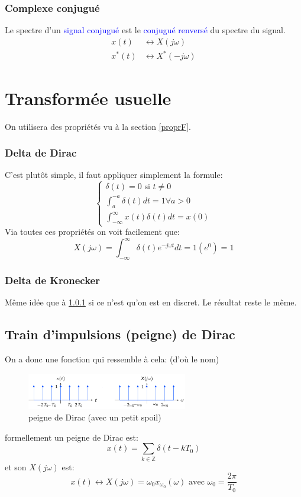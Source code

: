 \documentclass{report}
\begin{document}
\subsubsection{Complexe conjugué}
Le spectre d'un \textcolor{blue}{signal conjugué} est le \textcolor{blue}{conjugué renversé} du spectre du signal.
\begin{align*}
x(t) &\longleftrightarrow X(j\omega)\\
x^*(t) &\longleftrightarrow X^*(-j\omega)
\end{align*}


\section{Transformée usuelle}
On utilisera des propriétés vu à la section \ref{proprF}.

\subsubsection{Delta de Dirac} \label{Dirac}
C'est plutôt simple, il faut appliquer simplement la formule:
\begin{equation}
\begin{cases}
\delta(t) = 0 \text{ si } t \neq 0\\
\int_a^{-a} \delta(t) dt = 1 \forall a > 0\\
\int_{-\infty}^{\infty} x(t) \delta(t) dt = x(0)
\end{cases}
\end{equation}
Via toutes ces propriétés on voit facilement que:
\begin{equation}
X(j\omega) = \int_{-\infty}^{\infty} \delta(t) e^{-j \omega t} dt = 1(e^0) = 1
\end{equation}

\subsubsection{Delta de Kronecker}
Même idée que à \ref{Dirac} si ce n'est qu'on est en discret. Le résultat reste le même.

\subsection{Train d'impulsions (peigne) de Dirac}
On a donc une fonction qui ressemble à cela: (d'où le nom)
\begin{figure}[H]
\centering
\includegraphics[width=7cm]{img/peigne.png}
\caption{peigne de Dirac (avec un petit spoil)}
\end{figure}
formellement un peigne de Dirac est:
\begin{equation}
x(t) = \sum_{k \in \mathbb{Z}} \delta(t-kT_0)
\end{equation}
et son $X(j\omega)$ est:
\begin{equation}
x(t) \longleftrightarrow X(j\omega) = \omega_0 x_{\omega_0} (\omega) \text{ avec } \omega_0 = \frac{2\pi}{T_0}
\end{equation}
\end{document}
